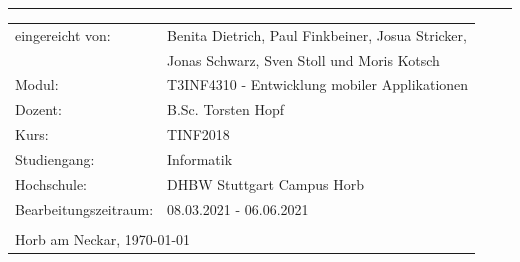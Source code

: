 \begin{flushleft}
    {\Large{}\rule[0.5ex]{1\columnwidth}{1pt}}{\Large\par}
    \par
\end{flushleft}

\begin{tabular}{ll}
    eingereicht von:\hspace{1cm} & Benita Dietrich, Paul Finkbeiner, Josua Stricker,
    \tabularnewline
    & Jonas Schwarz, Sven Stoll und Moris Kotsch
    \tabularnewline
    Modul: & T3INF4310 - Entwicklung mobiler Applikationen
    \tabularnewline
    Dozent: & B.Sc. Torsten Hopf
    \tabularnewline
    Kurs: & TINF2018
    \tabularnewline
    Studiengang: & Informatik
    \tabularnewline
    Hochschule: & DHBW Stuttgart Campus Horb
    \tabularnewline
    Bearbeitungszeitraum: & 08.03.2021 - 06.06.2021
    \tabularnewline
    \tabularnewline
    \multicolumn{2}{l}{Horb am Neckar, \today}
    \tabularnewline
\end{tabular}

\begin{flushleft}
    \newpage{}
    \par
\end{flushleft}